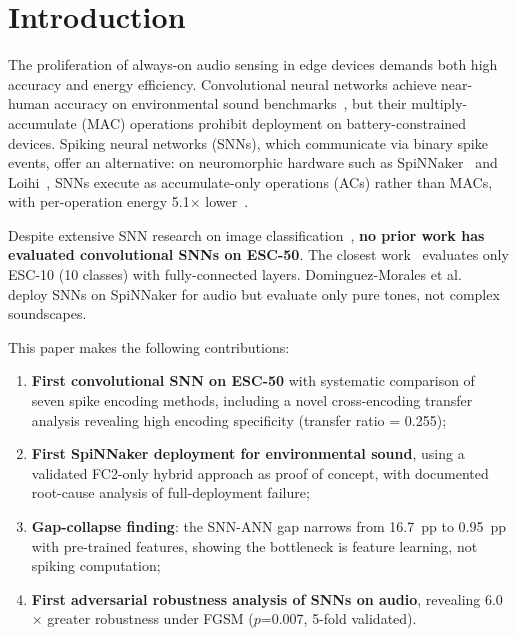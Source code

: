 \documentclass[sigconf,nonacm=false]{acmart}
\begin{document}


\maketitle

\section{Introduction}
\label{sec:intro}

The proliferation of always-on audio sensing in edge devices demands both high accuracy and energy efficiency. Convolutional neural networks achieve near-human accuracy on environmental sound benchmarks~\cite{piczak2015}, but their multiply-accumulate (MAC) operations prohibit deployment on battery-constrained devices. Spiking neural networks (SNNs), which communicate via binary spike events, offer an alternative: on neuromorphic hardware such as SpiNNaker~\cite{furber2014} and Loihi~\cite{davies2018}, SNNs execute as accumulate-only operations (ACs) rather than MACs, with per-operation energy 5.1$\times$ lower~\cite{horowitz2014}.

Despite extensive SNN research on image classification~\cite{eshraghian2023}, \textbf{no prior work has evaluated convolutional SNNs on ESC-50}. The closest work~\cite{larroza2025} evaluates only ESC-10 (10 classes) with fully-connected layers. Dominguez-Morales et al.~\cite{dominguez2016} deploy SNNs on SpiNNaker for audio but evaluate only pure tones, not complex soundscapes.

This paper makes the following contributions:
\begin{enumerate}
    \item \textbf{First convolutional SNN on ESC-50} with systematic comparison of seven spike encoding methods, including a novel cross-encoding transfer analysis revealing high encoding specificity (transfer ratio = 0.255);
    \item \textbf{First SpiNNaker deployment for environmental sound}, using a validated FC2-only hybrid approach as proof of concept, with documented root-cause analysis of full-deployment failure;
    \item \textbf{Gap-collapse finding}: the SNN-ANN gap narrows from 16.7~pp to 0.95~pp with pre-trained features, showing the bottleneck is feature learning, not spiking computation;
    \item \textbf{First adversarial robustness analysis of SNNs on audio}, revealing 6.0$\times$ greater robustness under FGSM ($p$=0.007, 5-fold validated).
\end{enumerate}
\end{document}

